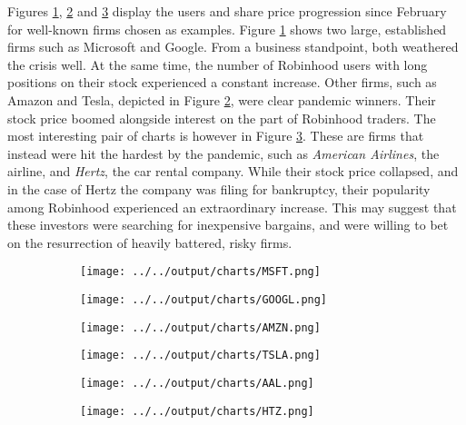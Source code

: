 \documentclass[12pt]{article}
\numberwithin{equation}{section} %
\begin{document}
Figures \ref{chart-established}, \ref{chart-winners} and \ref{chart-dead} display the users and share price progression since February for well-known firms chosen as examples. Figure \ref{chart-established} shows two large, established firms such as Microsoft and Google. From a business standpoint, both weathered the crisis well. At the same time, the number of Robinhood users with long positions on their stock experienced a constant increase. Other firms, such as Amazon and Tesla, depicted in Figure \ref{chart-winners}, were clear pandemic winners. Their stock price boomed alongside interest on the part of Robinhood traders. The most interesting pair of charts is however in Figure \ref{chart-dead}. These are firms that instead were hit the hardest by the pandemic, such as \textit{American Airlines}, the airline, and \textit{Hertz}, the car rental company. While their stock price collapsed, and in the case of Hertz the company was filing for bankruptcy, their popularity among Robinhood experienced an extraordinary increase. This may suggest that these investors were searching for inexpensive bargains, and were willing to bet on the resurrection of heavily battered, risky firms.



\begin{figure}
\centering
\caption{Test}
\begin{subfigure}{.5\textwidth}
\centering
\texttt{[image: ../../output/charts/MSFT.png]} 
\end{subfigure}%
\begin{subfigure}{.5\textwidth}
\centering
\texttt{[image: ../../output/charts/GOOGL.png]}
\end{subfigure}
\label{chart-established}
\end{figure}

\begin{figure}
\centering
\caption{Test}
\begin{subfigure}{.5\textwidth}
\centering
\texttt{[image: ../../output/charts/AMZN.png]} 
\end{subfigure}%
\begin{subfigure}{.5\textwidth}
\centering
\texttt{[image: ../../output/charts/TSLA.png]}
\end{subfigure}
\label{chart-winners}
\end{figure}

\begin{figure}
\centering
\caption{Test}
\begin{subfigure}{.5\textwidth}
\centering
\texttt{[image: ../../output/charts/AAL.png]} 
\end{subfigure}%
\begin{subfigure}{.5\textwidth}
\centering
\texttt{[image: ../../output/charts/HTZ.png]}
\end{subfigure}
\label{chart-dead}
\end{figure}
\end{document}
